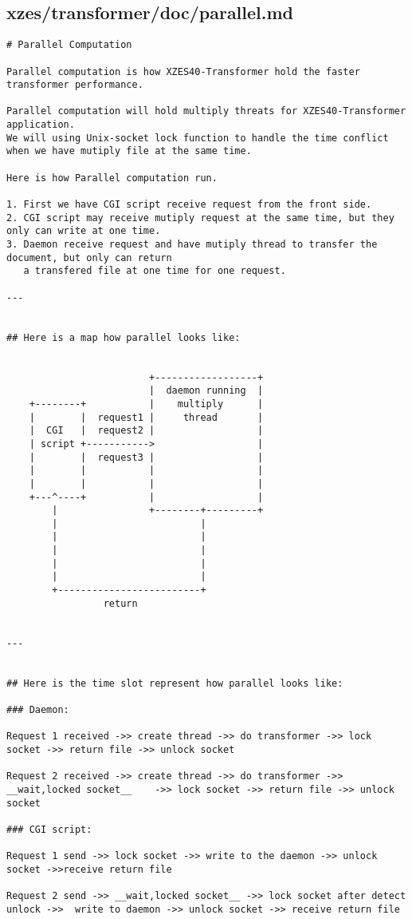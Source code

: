 \subsection{xzes/transformer/doc/parallel.md}
\begin{lstlisting}
# Parallel Computation

Parallel computation is how XZES40-Transformer hold the faster transformer performance.

Parallel computation will hold multiply threats for XZES40-Transformer application.
We will using Unix-socket lock function to handle the time conflict when we have mutiply file at the same time.

Here is how Parallel computation run.

1. First we have CGI script receive request from the front side.
2. CGI script may receive mutiply request at the same time, but they only can write at one time.
3. Daemon receive request and have mutiply thread to transfer the document, but only can return
   a transfered file at one time for one request. 

---


## Here is a map how parallel looks like:


                         +------------------+
                         |  daemon running  |
    +--------+           |    multiply      |
    |        |  request1 |     thread       |
    |  CGI   |  request2 |                  |
    | script +----------->                  |
    |        |  request3 |                  |
    |        |           |                  |
    |        |           |                  |
    +---^----+           |                  |
        |                +--------+---------+
        |                         |
        |                         |
        |                         |
        |                         |
        |                         |
        +-------------------------+
                 return


---


## Here is the time slot represent how parallel looks like:

### Daemon:

Request 1 received ->> create thread ->> do transformer ->> lock socket ->> return file ->> unlock socket

Request 2 received ->> create thread ->> do transformer ->>   __wait,locked socket__    ->> lock socket ->> return file ->> unlock socket

### CGI script:

Request 1 send ->> lock socket ->> write to the daemon ->> unlock socket ->>receive return file

Request 2 send ->> __wait,locked socket__ ->> lock socket after detect unlock ->>  write to daemon ->> unlock socket ->> receive return file
\end{lstlisting}
